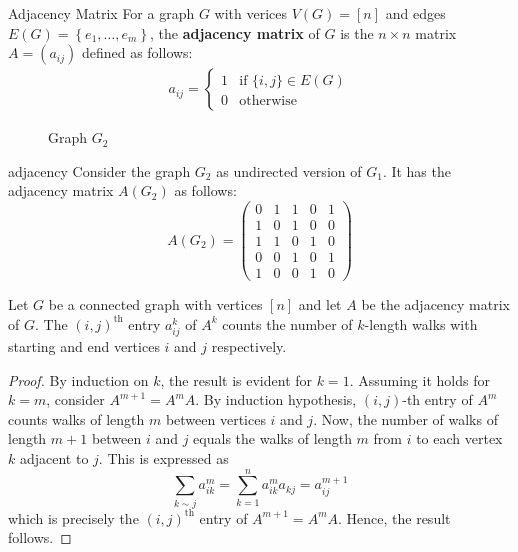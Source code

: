 \documentclass[../basic_graph_theory.tex]{subfiles}
\begin{document}
\begin{Def}{}{Adjacency Matrix}
  For a graph $G$ with verices $V(G) = [n]$ and edges $E(G) = \left\{ e_1, \dots, e_m \right\}$, the \textbf{adjacency matrix} of $G$ is the $n \times n$ matrix $A = (a_{ij})$ defined as follows:
  \begin{align*}
    a_{ij} = \begin{cases}
               1 & \text{if } \{i, j\} \in E(G) \\
               0 & \text{otherwise}
             \end{cases}
  \end{align*}
\end{Def}

\begin{figure}[ht]
  \centering
  \label{fig:adjacency}
  \caption{Graph $G_2$}
\end{figure}

\begin{Eg}{}{adjacency}
  Consider the graph $ G_2 $ as undirected version of \(G_1\). It has the adjacency matrix $ A(G_2) $ as follows:
  \[
    A(G_2) = \begin{pmatrix}
      0 & 1 & 1 & 0 & 1 \\
      1 & 0 & 1 & 0 & 0 \\
      1 & 1 & 0 & 1 & 0 \\
      0 & 0 & 1 & 0 & 1 \\
      1 & 0 & 0 & 1 & 0
    \end{pmatrix}
  \]
\end{Eg}

\begin{Thm}{}{}
  Let \(G\) be a connected graph with vertices \([n]\) and let \(A\) be the adjacency matrix of \(G\). The \((i,j)^{\text{th}}\) entry \(a_{ij}^k\) of \(A^k\) counts the number of \(k\)-length walks with starting and end vertices \(i\) and \(j\) respectively.
\end{Thm}
\begin{proof}
  By induction on \(k\), the result is evident for \(k = 1\). Assuming it holds for \(k = m\), consider \(A^{m+1} = A^m A\). By induction hypothesis, \((i,j)\)-th entry of \(A^m\) counts walks of length \(m\) between vertices \(i\) and \(j\). Now, the number of walks of length \(m + 1\) between \(i\) and \(j\) equals the walks of length \(m\) from \(i\) to each vertex \(k\) adjacent to \(j\). This is expressed as
  \[
    \sum_{k \sim j} a_{ik}^m = \sum_{k = 1}^{n} a^m_{ik} a_{kj} = a_{ij}^{m+1}
  \]
  which is precisely the \((i,j)^{\text{th}}\) entry of \(A^{m+1} = A^m A\). Hence, the result follows.
\end{proof}
\end{document}
